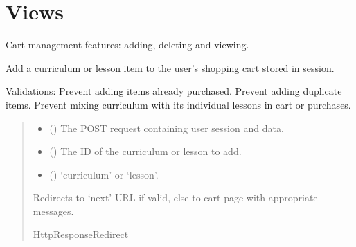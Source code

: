 \documentclass[letterpaper,10pt,english]{sphinxmanual}
\begin{document}
\section{Views}
\label{\detokenize{cart:views}}
\sphinxAtStartPar
Cart management features: adding, deleting and viewing.
\label{\detokenize{cart:module-cart.views}}

\begin{fulllineitems}
\label{\detokenize{cart:cart.views.add_to_cart}}
\pysigstartsignatures
\pysiglinewithargsret
{}
{\sphinxparamcomma {}\sphinxparamcomma {}}
{}
\pysigstopsignatures
\sphinxAtStartPar
Add a curriculum or lesson item to the user’s shopping cart stored in session.

\sphinxAtStartPar
Validations:
\sphinxhyphen{} Prevent adding items already purchased.
\sphinxhyphen{} Prevent adding duplicate items.
\sphinxhyphen{} Prevent mixing curriculum with its individual lessons in cart or purchases.
\begin{quote}\begin{description}
\begin{itemize}
\item {} 
\sphinxAtStartPar
{} () \textendash{} The POST request containing user session and data.

\item {} 
\sphinxAtStartPar
{} () \textendash{} The ID of the curriculum or lesson to add.

\item {} 
\sphinxAtStartPar
{} () \textendash{} ‘curriculum’ or ‘lesson’.

\end{itemize}

\sphinxAtStartPar
Redirects to ‘next’ URL if valid, else to cart page with appropriate messages.

\sphinxAtStartPar
HttpResponseRedirect

\end{description}\end{quote}

\end{fulllineitems}
\end{document}
